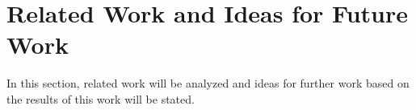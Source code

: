 \section{Related Work and Ideas for Future Work}
\label{sec:continuations}
In this section, related work will be analyzed and ideas for further work based on the results of this work will be stated.
